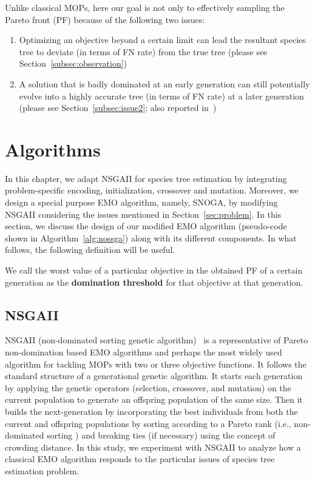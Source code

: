Unlike classical MOPs, here our goal is not only to effectively sampling the Pareto front (PF) because of the following two issues:
\begin{enumerate}[label=$I_\arabic*$]
	\item \label{item:i1} Optimizing an objective beyond a certain limit can lead the resultant species tree to deviate (in terms of FN rate) from the true tree (please see Section~\ref{subsec:observation})
\item \label{item:i2} A solution that is badly dominated at an early generation can still potentially evolve into a highly accurate tree (in terms of FN rate) at a later generation (please see Section~\ref{subsec:issue2}; also reported in~\cite{qu2010multi})
\end{enumerate}



%
 \section{Algorithms}
\label{sec:snoga-method}
In this chapter, we adapt NSGAII for species tree estimation by integrating problem-specific encoding, initialization, crossover and mutation. Moreover, we design a special purpose EMO algorithm, namely, SNOGA, by modifying NSGAII considering the issues mentioned in Section~\ref{sec:problem}. In this section, we discuss the design of our modified EMO algorithm (pseudo-code shown in Algorithm~\ref{alg:nossga}) along with its different components. In what follows, the following definition will be useful. 

 \label{def:domination_threshold}
{
	\small
	We call the worst value of a particular objective in the obtained PF of a certain generation as the \textbf{domination threshold} for that objective at that generation.
}

\subsection{NSGAII}
NSGAII (non-dominated sorting genetic algorithm)~\cite{deb2002fast} is a representative of Pareto non-domination based EMO algorithms and perhaps the most widely used algorithm for tackling MOPs with two or three objective functions. It follows the standard structure of a generational genetic algorithm. It starts each generation by applying the genetic operators (selection, crossover, and mutation) on the current population to generate an offspring population of the same size. Then it builds the next-generation by incorporating the best individuals from both the current and offspring populations by sorting according to a Pareto rank (i.e., non-dominated sorting ) and breaking ties (if necessary) using the concept of crowding distance. In this study, we experiment with NSGAII to analyze how a classical EMO algorithm responds to the particular issues of species tree estimation problem. 


